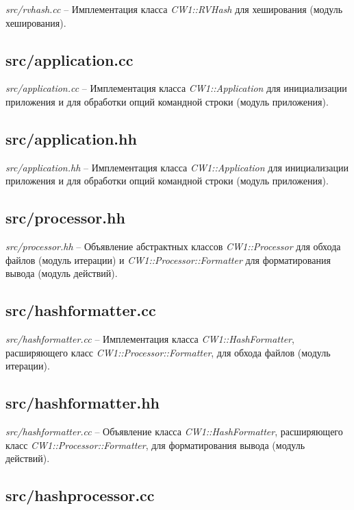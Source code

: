 \textit{src/rvhash.cc} -- Имплементация класса \textit{CW1::RVHash} для
хеширования (модуль хеширования).

\subsection{src/application.cc}

\textit{src/application.cc} -- Имплементация класса \textit{CW1::Application}
для инициализации приложения и для обработки опций командной строки (модуль
приложения).

\subsection{src/application.hh}

\textit{src/application.hh} -- Имплементация класса \textit{CW1::Application} для
инициализации приложения и для обработки опций командной строки (модуль
приложения).

\subsection{src/processor.hh}

\textit{src/processor.hh} -- Объявление абстрактных классов
\textit{CW1::Processor} для обхода файлов (модуль итерации) и
\textit{CW1::Processor::Formatter} для форматирования вывода (модуль действий).

\subsection{src/hashformatter.cc}

\textit{src/hashformatter.cc} -- Имплементация класса
\textit{CW1::HashFormatter}, расширяющего класс
\textit{CW1::Processor::Formatter}, для обхода файлов (модуль итерации).

\subsection{src/hashformatter.hh}

\textit{src/hashformatter.cc} -- Объявление класса
\textit{CW1::HashFormatter}, расширяющего класс
\textit{CW1::Processor::Formatter}, для форматирования вывода (модуль действий).

\subsection{src/hashprocessor.cc}

